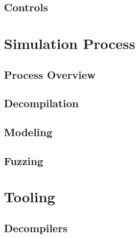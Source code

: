 \chapter{Controls} \label{ch:controls}



\part{Simulation Process} \label{sec:simulation-process}
\chapter{Process Overview} \label{ch:process-overview}

\chapter{Decompilation} \label{ch:decompilation}

\chapter{Modeling} \label{ch:modeling}

\chapter{Fuzzing} \label{ch:fuzzing}



\part{Tooling} \label{sec:evasion}
\chapter{Decompilers} \label{ch:decompilers}

